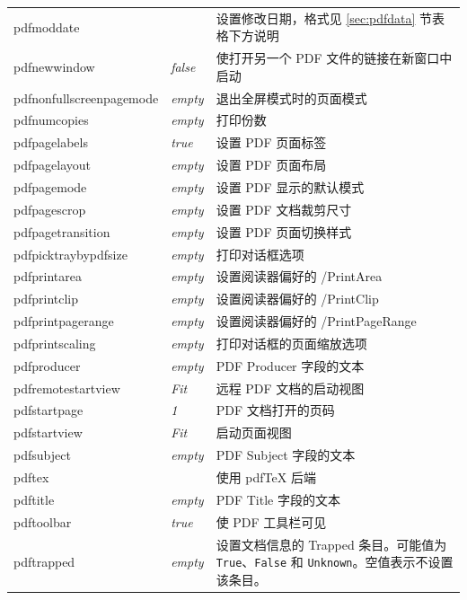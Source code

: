 \documentclass{article}
\begin{document}
\begin{longtable}{@{}>{\ttfamily}llp{7cm}@{}}
pdfmoddate         &                        & 设置修改日期，格式见 \ref{sec:pdfdata} 节表格下方说明\\
pdfnewwindow       & \textit{false}         & 使打开另一个 PDF 文件的链接在新窗口中启动\\
pdfnonfullscreenpagemode
                   & \textit{empty}         & 退出全屏模式时的页面模式\\
pdfnumcopies       & \textit{empty}         & 打印份数\\
pdfpagelabels      & \textit{true}          & 设置 PDF 页面标签\\
pdfpagelayout      & \textit{empty}         & 设置 PDF 页面布局\\
pdfpagemode        & \textit{empty}         & 设置 PDF 显示的默认模式\\
pdfpagescrop       & \textit{empty}         & 设置 PDF 文档裁剪尺寸\\
pdfpagetransition  & \textit{empty}         & 设置 PDF 页面切换样式\\
pdfpicktraybypdfsize
                   & \textit{empty}         & 打印对话框选项\\
pdfprintarea       & \textit{empty}         & 设置阅读器偏好的 /PrintArea\\
pdfprintclip       & \textit{empty}         & 设置阅读器偏好的 /PrintClip\\
pdfprintpagerange  & \textit{empty}         & 设置阅读器偏好的 /PrintPageRange\\
pdfprintscaling    & \textit{empty}         & 打印对话框的页面缩放选项\\
pdfproducer        & \textit{empty}         & PDF Producer 字段的文本\\
pdfremotestartview & \textit{Fit}           & 远程 PDF 文档的启动视图\\
pdfstartpage       & \textit{1}             & PDF 文档打开的页码\\
pdfstartview       & \textit{Fit}           & 启动页面视图\\
pdfsubject         & \textit{empty}         & PDF Subject 字段的文本\\
pdftex             &                        & 使用 \textsf{pdf\TeX} 后端\\
pdftitle           & \textit{empty}         & PDF Title 字段的文本\\
pdftoolbar         & \textit{true}          & 使 PDF 工具栏可见\\
pdftrapped         & \textit{empty}         & 设置文档信息的 Trapped 条目。可能值为 \texttt{True}、\texttt{False} 和 \texttt{Unknown}。空值表示不设置该条目。\\

\end{longtable}
\end{document}
